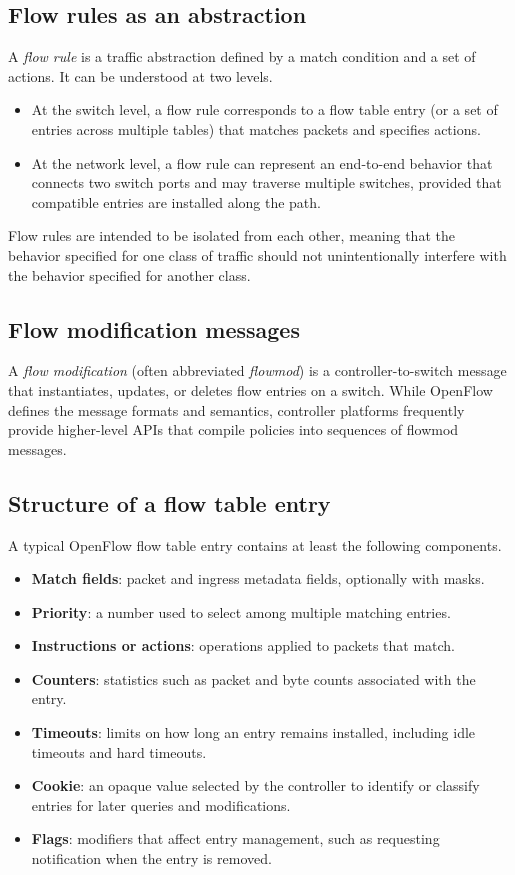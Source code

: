 \documentclass[11pt,a4paper,openany]{report}
\begin{document}
\subsection{Flow rules as an abstraction}

A \emph{flow rule} is a traffic abstraction defined by a match condition and a set of actions. It can be understood at two levels.

\begin{itemize}
\item At the switch level, a flow rule corresponds to a flow table entry (or a set of entries across multiple tables) that matches packets and specifies actions.
\item At the network level, a flow rule can represent an end-to-end behavior that connects two switch ports and may traverse multiple switches, provided that compatible entries are installed along the path.
\end{itemize}

Flow rules are intended to be isolated from each other, meaning that the behavior specified for one class of traffic should not unintentionally interfere with the behavior specified for another class.

\subsection{Flow modification messages}

A \emph{flow modification} (often abbreviated \emph{flowmod}) is a controller-to-switch message that instantiates, updates, or deletes flow entries on a switch. While OpenFlow defines the message formats and semantics, controller platforms frequently provide higher-level APIs that compile policies into sequences of flowmod messages.

\subsection{Structure of a flow table entry}

A typical OpenFlow flow table entry contains at least the following components.

\begin{itemize}
\item \textbf{Match fields}: packet and ingress metadata fields, optionally with masks.
\item \textbf{Priority}: a number used to select among multiple matching entries.
\item \textbf{Instructions or actions}: operations applied to packets that match.
\item \textbf{Counters}: statistics such as packet and byte counts associated with the entry.
\item \textbf{Timeouts}: limits on how long an entry remains installed, including idle timeouts and hard timeouts.
\item \textbf{Cookie}: an opaque value selected by the controller to identify or classify entries for later queries and modifications.
\item \textbf{Flags}: modifiers that affect entry management, such as requesting notification when the entry is removed.
\end{itemize}
\end{document}
